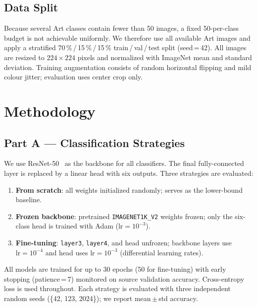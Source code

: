 \documentclass[conference]{IEEEtran}
\begin{document}
\subsection{Data Split}

Because several Art classes contain fewer than 50 images, a fixed 50-per-class budget is not
achievable uniformly.
We therefore use all available Art images and apply a stratified 70\,\%\,/\,15\,\%\,/\,15\,\%
train\,/\,val\,/\,test split (seed\,=\,42).
All images are resized to $224\times224$ pixels and normalized with ImageNet
mean and standard deviation.
Training augmentation consists of random horizontal flipping and mild
colour jitter; evaluation uses center crop only.

\section{Methodology}
\label{sec:method}

\subsection{Part A — Classification Strategies}

We use ResNet-50~\cite{he2016resnet} as the backbone for all classifiers.
The final fully-connected layer is replaced by a linear head with six outputs.
Three strategies are evaluated:

\begin{enumerate}
  \item \textbf{From scratch}: all weights initialized randomly; serves as the lower-bound baseline.
  \item \textbf{Frozen backbone}: pretrained \texttt{IMAGENET1K\_V2} weights frozen; only the
        six-class head is trained with Adam ($\text{lr} = 10^{-3}$).
  \item \textbf{Fine-tuning}: \texttt{layer3}, \texttt{layer4}, and head unfrozen; backbone
        layers use $\text{lr} = 10^{-4}$ and head uses $\text{lr} = 10^{-3}$ (differential
        learning rates).
\end{enumerate}

All models are trained for up to 30 epochs (50 for fine-tuning) with early stopping
(patience\,=\,7) monitored on source validation accuracy.
Cross-entropy loss is used throughout.
Each strategy is evaluated with three independent random seeds
(\{42, 123, 2024\}); we report mean\,$\pm$\,std accuracy.
\end{document}
